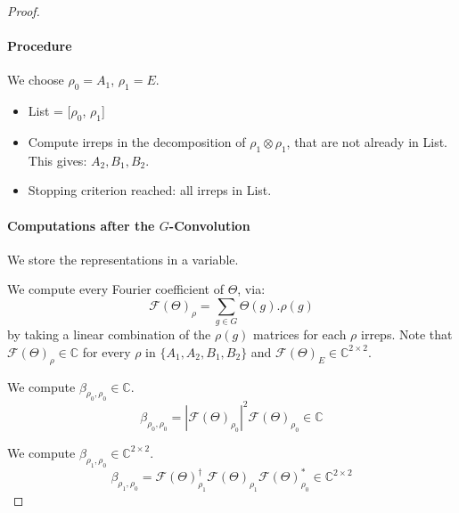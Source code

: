 \documentclass{article}
\begin{document}
\begin{proof}
\paragraph{Procedure} We choose $\rho_0 = A_1$, $\rho_1 = E$.
\begin{itemize}
    \item List = [$\rho_0$, $\rho_1$]
    \item Compute irreps in the decomposition of $\rho_1 \otimes \rho_1$, that are not already in List. This gives: $A_2, B_1, B_2$.
    \item Stopping criterion reached: all irreps in List.
\end{itemize}

\paragraph{Computations after the $G$-Convolution}

We store the representations in a variable.

We compute every Fourier coefficient of $\Theta$, via:
\begin{equation}
    \mathcal{F}(\Theta)_\rho = \sum_{g \in G} \Theta(g).\rho(g)
\end{equation}
by taking a linear combination of the $\rho(g)$ matrices for each $\rho$ irreps. Note that $\mathcal{F}(\Theta)_\rho \in \mathbb{C}$ for every $\rho$ in $\{A_1, A_2, B_1, B_2\}$ and $\mathcal{F}(\Theta)_E \in \mathbb{C}^{2 \times 2}$.

We compute $\beta_{\rho_0, \rho_0} \in \mathbb{C}$.
\begin{equation}
    \beta_{\rho_0, \rho_0} = |\mathcal{F}(\Theta)_{\rho_0}|^2 \mathcal{F}(\Theta)_{\rho_0} \in \mathbb{C}
\end{equation}

We compute $\beta_{\rho_1, \rho_0} \in \mathbb{C}^{2 \times 2}$.
\begin{equation}
    \beta_{\rho_1, \rho_0} = \mathcal{F}(\Theta)_{\rho_1}^\dagger\mathcal{F}(\Theta)_{\rho_1} \mathcal{F}(\Theta)_{\rho_0}^* \in \mathbb{C}^{2 \times 2}
\end{equation}


\end{proof}
\end{document}

